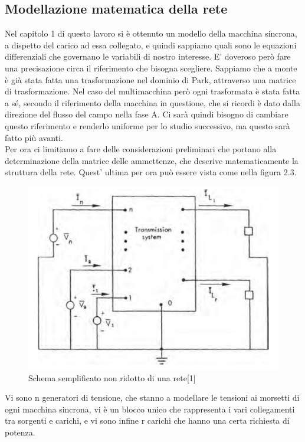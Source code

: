 \documentclass[Lau,noexaminfo]{sapthesis}
\begin{document}
	\subsection{Modellazione matematica della rete}
	Nel capitolo 1 di questo lavoro si è ottenuto un modello della macchina sincrona, a dispetto del carico ad essa collegato, e quindi sappiamo quali sono le equazioni differenziali che governano le variabili di nostro interesse. E' doveroso però fare una precisazione circa il riferimento che bisogna scegliere. Sappiamo che a monte è già stata fatta una trasformazione nel dominio di Park, attraverso una matrice di trasformazione. Nel caso del multimacchina però ogni trasformata è stata fatta a sé, secondo il riferimento della macchina in questione, che si ricordi è dato dalla direzione del flusso del campo nella fase A. Ci sarà quindi bisogno di cambiare questo riferimento e renderlo uniforme per lo studio successivo, ma questo sarà fatto più avanti.\\
	Per ora ci limitiamo a fare delle considerazioni preliminari che portano alla determinazione della matrice delle ammettenze, che descrive matematicamente la struttura della rete. Quest' ultima per ora può essere vista come nella figura 2.3.
	\begin{figure}
		\centering
		\includegraphics[height=0.3\textheight]{nonridotta}
		\caption{Schema semplificato non ridotto di una rete[1]}
	\end{figure}
	Vi sono n generatori di tensione, che stanno a modellare le tensioni ai morsetti di ogni macchina sincrona, vi è un blocco unico che rappresenta i vari collegamenti tra sorgenti e carichi, e vi sono infine r carichi che hanno una certa richiesta di potenza.
\end{document}
